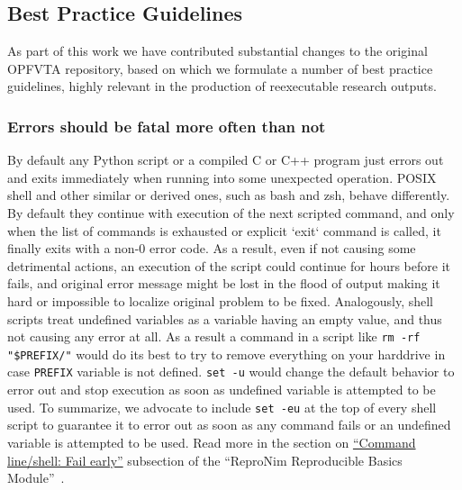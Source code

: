 \subsection{Best Practice Guidelines}

As part of this work we have contributed substantial changes to the original OPFVTA repository, based on which we formulate a number of best practice guidelines, highly relevant in the production of reexecutable research outputs.

\subsubsection{Errors should be fatal more often than not}

By default any Python script or a compiled C or C++ program just errors out and exits immediately when running into some unexpected operation.
POSIX shell and other similar or derived ones, such as bash and zsh,  behave differently.
By default they continue with execution of the next scripted command, and only when the list of commands is exhausted or explicit `exit` command is called, it finally exits with a non-0 error code.
As a result, even if not causing some detrimental actions, an execution of the script could continue for hours before it fails, and original error message might be lost in the flood of output making it hard or impossible to localize original problem to be fixed.
Analogously, shell scripts treat undefined variables as a variable having an empty value, and thus not causing any error at all.
As a result a command in a script like \texttt{rm -rf "\${PREFIX}/"} would do its best to try to remove everything on your harddrive in case \texttt{PREFIX} variable is not defined.
\texttt{set -u} would change the default behavior to error out and stop execution as soon as undefined variable is attempted to be used.
To summarize, we advocate to include \texttt{set -eu} at the top of every shell script to guarantee it to error out as soon as any command fails or an undefined variable is attempted to be used.
Read more in the section on \href{https://www.repronim.org/module-reproducible-basics/01-shell-basics/\#fail-early}{``Command line/shell: Fail early''} subsection of the ``ReproNim Reproducible Basics Module''~\cite{repronim:reprobasics}.

